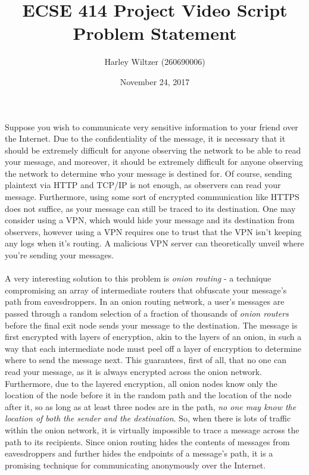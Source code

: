 \documentclass[12pt]{article}
\title{ECSE 414 Project Video Script\\Problem Statement}
\author{Harley Wiltzer (260690006)}
\date{November 24, 2017}
\begin{document}
\maketitle
Suppose you wish to communicate very sensitive information to your friend over the Internet. Due to
the confidentiality of the message, it is necessary that it should be extremely difficult for anyone
observing the network to be able to read your message, and moreover, it should be extremely
difficult for anyone observing the network to determine who your message is destined for. Of course,
sending plaintext via HTTP and TCP/IP is not enough, as observers can read your message.
Furthermore, using some sort of encrypted communication like HTTPS does not suffice, as your message
can still be traced to its destination. One may consider using a VPN, which would hide your message
and its destination from observers, however using a VPN requires one to trust that the VPN isn't
keeping any logs when it's routing. A malicious VPN server can theoretically unveil where you're
sending your messages.\\\\
A very interesting solution to this problem is \textit{onion routing} - a technique compromising an
array of intermediate routers that obfuscate your message's path from eavesdroppers. In an onion
routing network, a user's messages are passed through a random selection of a fraction of thousands
of \textit{onion routers} before the final exit node sends your message to the destination. The
message is first encrypted with layers of encryption, akin to the layers of an onion, in such a way
that each intermediate node must peel off a layer of encryption to determine where to send the
message next. This guarantees, first of all, that no one can read your message, as it is always
encrypted across the onion network. Furthermore, due to the layered encryption, all onion nodes know
only the location of the node before it in the random path and the location of the node after it, so
as long as at least three nodes are in the path, \textit{no one may know the location of both the
sender and the destination}. So, when there is lots of traffic within the onion network, it is virtually
impossible to trace a message across the path to its recipients. Since onion routing hides the
contents of messages from eavesdroppers and further hides the endpoints of a message's path, it is a
promising technique for communicating anonymously over the Internet.
\end{document}
